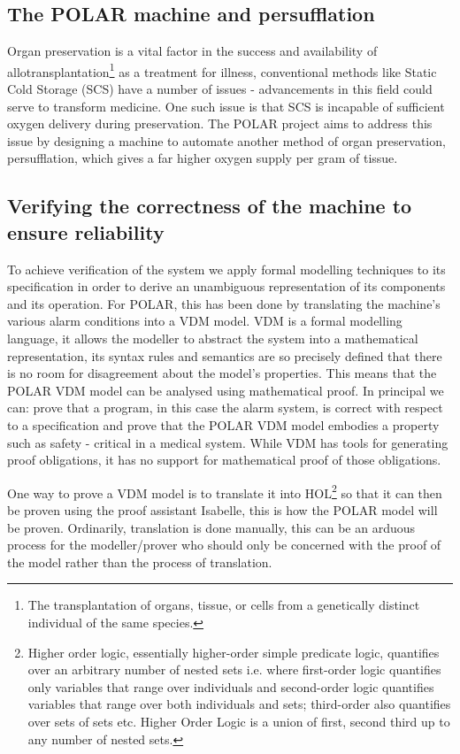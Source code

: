 \subsection{The POLAR machine and persufflation}
Organ preservation is a vital factor in the success and availability of allotransplantation\footnote{The transplantation of organs, tissue, or cells from a genetically distinct individual of the same species.} as a treatment for illness, conventional methods like Static Cold Storage (SCS) have a number of issues - advancements in this field could serve to transform medicine\parencite{Giwa2017}. One such issue is that SCS is incapable of sufficient oxygen delivery during preservation\parencite{Pappas2005}. The POLAR project aims to address this issue by designing a machine to automate another method of organ preservation, persufflation, which gives a far higher oxygen supply per gram of tissue. 

\subsection{Verifying the correctness of the machine to ensure reliability}
To achieve verification of the system we apply formal modelling techniques to its specification in order to derive an unambiguous representation of its components and its operation. For POLAR, this has been done by translating the machine's various alarm conditions into a VDM model. VDM is a formal modelling language, it allows the modeller to abstract the system into a mathematical representation, its syntax rules and semantics are so precisely defined that there is no room for disagreement about the model’s properties. This means that the POLAR VDM model can be analysed using mathematical proof. In principal we can: prove that a program, in this case the alarm system, is correct with respect to a specification and prove that the POLAR VDM model embodies a property such as safety - critical in a medical system. While VDM has tools for generating proof obligations, it has no support for mathematical proof of those obligations.

One way to prove a VDM model is to translate it into HOL\footnote{Higher order logic, essentially higher-order simple predicate logic, quantifies over an arbitrary number of nested sets i.e. where first-order logic quantifies only variables that range over individuals and second-order logic quantifies variables that range over both individuals and sets; third-order also quantifies over sets of sets etc. Higher Order Logic is a union of first, second third up to any number of nested sets.} so that it can then be proven using the proof assistant Isabelle, this is how the POLAR model will be proven. Ordinarily, translation is done manually, this can be an arduous process for the modeller/prover who should only be concerned with the proof of the model rather than the process of translation. 

